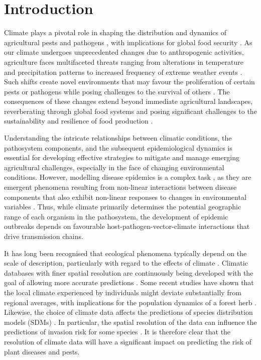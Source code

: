 \section{Introduction}

Climate plays a pivotal role in shaping the distribution and dynamics of
agricultural pests and pathogens
\cite{Harvell2002,Lafferty2009,Bebber2013,Bebber2014,Delgado-Baquerizo2020},
with implications for global food security \cite{Fones2020, Ristaino}. As our
climate undergoes unprecedented changes due to anthropogenic activities,
agriculture faces multifaceted threats ranging from alterations in temperature
and precipitation patterns to increased frequency of extreme weather events
\cite{skendzic2021impact}. Such shifts create novel environments that may
favour the proliferation of certain pests or pathogens while posing challenges
to the survival of others \cite{Bebber2013, Dudney2021}. The consequences of
these changes extend beyond immediate agricultural landscapes, reverberating
through global food systems and posing significant challenges to the
sustainability and resilience of food production \cite{Ortiz-Bobea2021}.

Understanding the intricate relationships between climatic conditions, the
pathosystem components, and the subsequent epidemiological dynamics is
essential for developing effective strategies to mitigate and manage emerging
agricultural challenges, especially in the face of changing environmental
conditions. However, modelling disease epidemics is a complex task , as they
are emergent phenomena resulting from non-linear interactions between disease
components that also exhibit non-linear responses to changes in environmental
variables \cite{scherm1994global,garrett2011complexity,jeger2019epidemiology}.
Thus, while climate primarily determines the potential geographic range of each
organism in the pathosystem, the development of epidemic outbreaks depends on
favourable host-pathogen-vector-climate interactions that drive transmission
chains.

It has long  been recognised that ecological phenomena typically depend on
the scale of description,  particularly with regard to the effects of climate
\cite{Levin1992}. Climatic databases with finer spatial resolution are
continuously being developed with the goal of allowing more accurate
predictions \cite{Navarro-Racines2020}.  Some recent studies have shown that
the local climate experienced by individuals might deviate substantially from
regional averages, with implications for the population dynamics of a forest
herb \cite{Christiansen2024}. Likewise, the choice of climate data affects the
predictions of species distribution models (SDMs) \cite{Abdulwahab2022}. In
particular, the spatial resolution of the data can influence the predictions of
invasion risk for some species \cite{Dubos2023}.  It is therefore clear that
the resolution of climate data will have a significant impact on predicting the
risk of plant diseases and pests.

